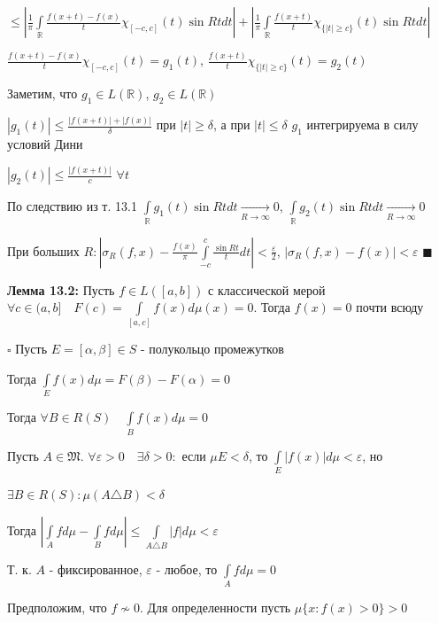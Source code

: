 \documentclass[a4paper]{report}
\begin{document}
\noindent$\le\left|\displaystyle\frac1\pi\displaystyle\int\limits_{\mathbb R}\frac{f(x+t)-f(x)}{t}\chi_{[-c,c]}(t)\sin Rtdt\right|+\left|\displaystyle\frac1\pi\displaystyle\int\limits_{\mathbb R}\frac{f(x+t)}{t}\chi_{\{|t|\ge c\}}(t)\sin Rtdt\right|$

$\displaystyle\frac{f(x+t)-f(x)}{t}\chi_{[-c,c]}(t)=g_1(t)$, $\displaystyle\frac{f(x+t)}{t}\chi_{\{|t|\ge c\}}(t)=g_2(t)$

Заметим, что $g_1\in L(\mathbb R)$, $g_2\in L(\mathbb R)$

$|g_1(t)|\le\displaystyle\frac{|f(x+t)|+|f(x)|}{\delta}$ при $|t|\ge\delta$, а при $|t|\le\delta$ $g_1$ интегрируема в силу условий Дини

$|g_2(t)|\le\displaystyle\frac{|f(x+t)|}{c}$ $\forall t$

По следствию из т. 13.1 $\displaystyle\int\limits_{\mathbb R}g_1(t)\sin Rtdt\xrightarrow[R\to\infty]{}0$, $\displaystyle\int\limits_{\mathbb R}g_2(t)\sin Rtdt\xrightarrow[R\to\infty]{}0$

При больших $R\colon\left|\sigma_R(f,x)-\displaystyle\frac{f(x)}{\pi}\displaystyle\int\limits_{-c}^c\frac{\sin Rt}{t}dt\right|<\displaystyle\frac{\varepsilon}{2}$, $\left|\sigma_R(f,x)-f(x)\right|<\varepsilon$ $\blacksquare$
\bigskip

\noindent\textbf{Лемма 13.2:} Пусть $f\in L([a,b])$ с классической мерой $\forall c\in(a,b]\quad F(c)=\displaystyle\int\limits_{[a,c]}f(x)d\mu(x)=0$. Тогда $f(x)=0$ почти всюду

\noindent $\square$ Пусть $E=[\alpha,\beta]\in S$ - полукольцо промежутков

Тогда $\displaystyle\int\limits_E f(x)d\mu=F(\beta)-F(\alpha)=0$

Тогда $\forall B\in R(S)\quad\displaystyle\int\limits_B f(x)d\mu=0$

Пусть $A\in\mathfrak M$. $\forall\varepsilon>0\quad\exists\delta>0\colon$ если $\mu E<\delta$, то $\displaystyle\int\limits_E|f(x)|d\mu<\varepsilon$, но

\noindent $\exists B\in R(S)\colon\mu(A\triangle B)<\delta$

Тогда $\left|\displaystyle\int\limits_A fd\mu-\displaystyle\int\limits_B fd\mu\right|\le\displaystyle\int\limits_{A\triangle B}|f|d\mu<\varepsilon$

Т. к. $A$ - фиксированное, $\varepsilon$ - любое, то $\displaystyle\int\limits_A fd\mu=0$

Предположим, что $f\nsim0$. Для определенности пусть $\mu\{x\colon f(x)>0\}>0$
\end{document}
